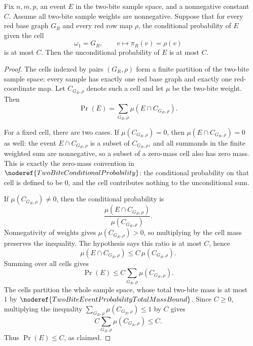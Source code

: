 \begin{lemma}
Fix \(n,m,p\), an event \(E\) in the two-bite sample space, and a
nonnegative constant \(C\).  Assume all two-bite sample weights are
nonnegative.  Suppose that for every red base graph \(G_R\) and every red row
map \(\rho\), the conditional probability of \(E\) given the cell
\[
\omega_1=G_R,\qquad v\mapsto \pi_R(v)=\rho(v)
\]
is at most \(C\).  Then the unconditional probability of \(E\) is at most
\(C\).
\end{lemma}
\begin{proof}
The cells indexed by pairs \((G_R,\rho)\) form a finite partition of the
two-bite sample space: every sample has exactly one red base graph and exactly
one red-coordinate map.  Let \(C_{G_R,\rho}\) denote such a cell and let
\(\mu\) be the two-bite weight.  Then
\[
\Pr(E)=\sum_{G_R,\rho}\mu(E\cap C_{G_R,\rho}).
\]

For a fixed cell, there are two cases.  If \(\mu(C_{G_R,\rho})=0\), then
\(\mu(E\cap C_{G_R,\rho})=0\) as well: the event \(E\cap C_{G_R,\rho}\) is a
subset of \(C_{G_R,\rho}\), and all summands in the finite weighted sum are
nonnegative, so a subset of a zero-mass cell also has zero mass.  This is
exactly the zero-mass convention in
\(\noderef{TwoBiteConditionalProbability}\): the conditional probability on
that cell is defined to be \(0\), and the cell contributes nothing to the
unconditional sum.

If \(\mu(C_{G_R,\rho})\ne0\), then the conditional probability is
\[
\frac{\mu(E\cap C_{G_R,\rho})}{\mu(C_{G_R,\rho})}.
\]
Nonnegativity of weights gives \(\mu(C_{G_R,\rho})>0\), so multiplying by the
cell mass preserves the inequality.
The hypothesis says this ratio is at most \(C\), hence
\[
\mu(E\cap C_{G_R,\rho})\le C\,\mu(C_{G_R,\rho}).
\]
Summing over all cells gives
\[
\Pr(E)\le C\sum_{G_R,\rho}\mu(C_{G_R,\rho}).
\]
The cells partition the whole sample space, whose total two-bite mass is at
most \(1\) by \(\noderef{TwoBiteEventProbabilityTotalMassBound}\).  Since
\(C\ge0\), multiplying the inequality
\(\sum_{G_R,\rho}\mu(C_{G_R,\rho})\le1\) by \(C\) gives
\[
C\sum_{G_R,\rho}\mu(C_{G_R,\rho})\le C.
\]
Thus \(\Pr(E)\le C\), as claimed.
\end{proof}
